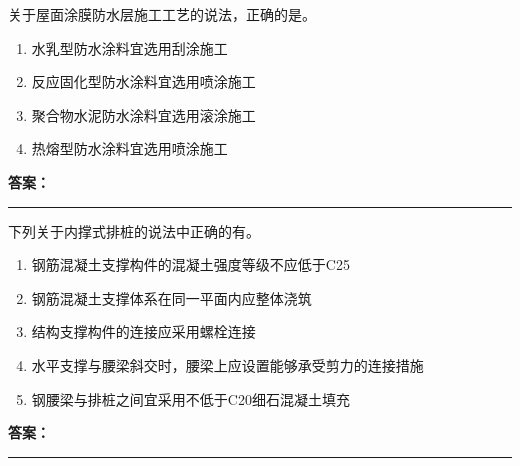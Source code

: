 \documentclass[UTF8,fontset=fandol,11pt]{ctexart}
\newcommand{\answerline}{\textcolor{answerred}{\rule{2.4cm}{0.7pt}}}
\begin{document}
\begin{quizbox}[title={乱序第 35 题｜第九章防水工程}]

关于屋面涂膜防水层施工工艺的说法，正确的是。\\

\begin{enumerate}[label=\Alph*.]

\item 水乳型防水涂料宜选用刮涂施工

\item 反应固化型防水涂料宜选用喷涂施工

\item 聚合物水泥防水涂料宜选用滚涂施工

\item 热熔型防水涂料宜选用喷涂施工

\end{enumerate}

\textbf{\textcolor{answerred}{答案：}} \answerline

\end{quizbox}

\vspace{0.2em}

\begin{quizbox}[title={乱序第 36 题｜第三章基坑工程}]

下列关于内撑式排桩的说法中正确的有。\\

\begin{enumerate}[label=\Alph*.]

\item 钢筋混凝土支撑构件的混凝土强度等级不应低于C25

\item 钢筋混凝土支撑体系在同一平面内应整体浇筑

\item 结构支撑构件的连接应采用螺栓连接

\item 水平支撑与腰梁斜交时，腰梁上应设置能够承受剪力的连接措施

\item 钢腰梁与排桩之间宜采用不低于C20细石混凝土填充

\end{enumerate}

\textbf{\textcolor{answerred}{答案：}} \answerline

\end{quizbox}

\vspace{0.2em}
\end{document}
